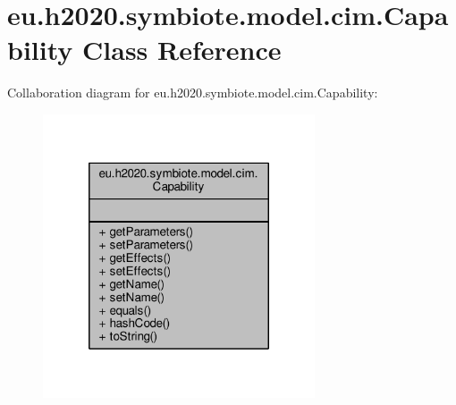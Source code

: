 \hypertarget{classeu_1_1h2020_1_1symbiote_1_1model_1_1cim_1_1Capability}{}\section{eu.\+h2020.\+symbiote.\+model.\+cim.\+Capability Class Reference}
\label{classeu_1_1h2020_1_1symbiote_1_1model_1_1cim_1_1Capability}


Collaboration diagram for eu.\+h2020.\+symbiote.\+model.\+cim.\+Capability\+:\nopagebreak
\begin{figure}[H]
\begin{center}
\leavevmode
\includegraphics[width=228pt]{classeu_1_1h2020_1_1symbiote_1_1model_1_1cim_1_1Capability__coll__graph}
\end{center}
\end{figure}
